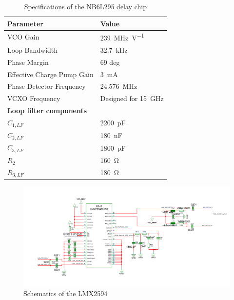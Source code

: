 \begin{table}[tbh]
	\caption[NB6L295 Characteristics]{Specifications of the NB6L295 delay chip \cite{NB6L295}}
	\label{tab:lmx2594_filter}
	\centering
	\begin{tabularx}{\textwidth}{Xl}
		\toprule
		\textbf{Parameter} & \textbf{Value} \\
		\bottomrule
		 VCO Gain & \SI{239}{\mega \hertz \per \volt} \\
		 Loop Bandwidth	 & \SI{32.7}{\kilo \hertz} \\
		 Phase Margin	 & 69 deg \\
		 Effective Charge Pump Gain	 & \SI{3}{\milli \ampere} \\
		 Phase Detector Frequency & \SI{24.576}{\mega \hertz}\\
		 VCXO Frequency	& Designed for \SI{15}{\giga \hertz}\\ [0.3cm]
		 \textbf{Loop filter components} & \\
		 $C_{1,LF}$ &  \SI{2200}{\pico \farad}\\
		 $C_{2,LF}$ &  \SI{180}{\nano \farad}\\
		 $C_{3,LF}$ &  \SI{1800}{\pico \farad}\\
		 $R_{2}$ &  \SI{160}{\ohm}\\
		 $R_{3,LF}$ &  \SI{180}{\ohm}\\
		 \bottomrule
	\end{tabularx}
\end{table}


\begin{figure}[tbh]
	\centering
	\includegraphics[width = \textwidth]{chap/04-work/img/lmx2594}
	\caption{Schematics of the LMX2594}
	\label{fig:lmx2594}
\end{figure}

